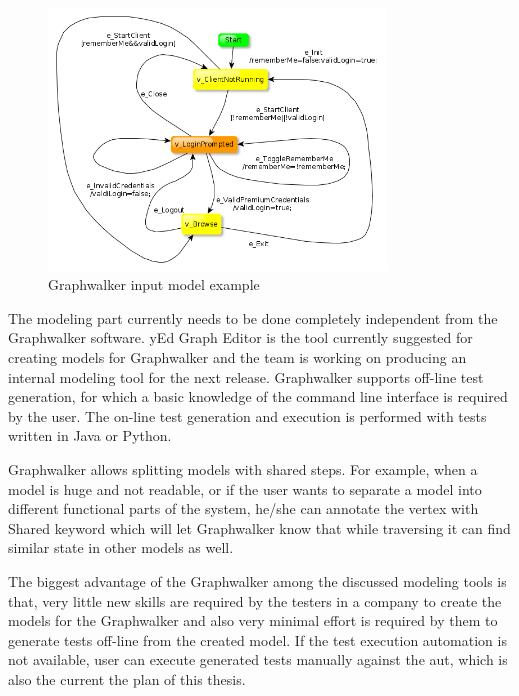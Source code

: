 \begin{figure} [htbp!]
	\centering
					\includegraphics[width=0.8\textwidth]{figures/Graphwalker_model_example.png}
					\caption{\label{Fig:Graphwalker_model_example} Graphwalker input model example \cite{Graphwalker_Login_Example}}
\end{figure}

\par
The modeling part currently needs to be done completely independent from the Graphwalker software. yEd Graph Editor \cite{yEd} is the tool currently suggested for creating models for Graphwalker and the team is working on producing an internal modeling tool for the next release. Graphwalker supports off-line test generation, for which a basic knowledge of the command line interface is required by the user. The on-line test generation and execution is performed with tests written in Java or Python. 

\par
Graphwalker allows splitting models with shared steps. For example, when a model is huge and not readable, or if the user wants to separate a model into different functional parts of the system, he/she can annotate the vertex with Shared keyword which will let Graphwalker know that while traversing it can find similar state in other models as well.

\par
The biggest advantage of the Graphwalker among the discussed modeling tools is that, very little new skills are required by the testers in a company to create the models for the Graphwalker and also very minimal effort is required by them to generate tests off-line from the created model. If the test execution automation is not available, user can execute generated tests manually against the \acrshort{aut}, which is also the current the plan of this thesis.

